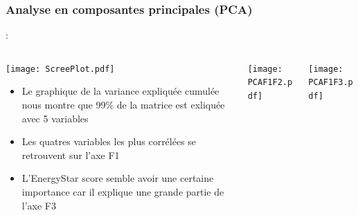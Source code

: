 \documentclass[8pt,aspectratio=169,hyperref={unicode=true}]{beamer}
\begin{document}
\subsubsection{Analyse en composantes principales (PCA)}
\begin{frame}[t]{\insertsection : \insertsubsection}{\insertsubsubsection}
  \begin{columns}
    \begin{column}{.33\textwidth}
      \texttt{[image: ScreePlot.pdf]}
      \begin{itemize}
        \item Le graphique de la variance expliquée cumulée nous montre que
              99\% de la matrice est exliquée avec 5 variables
        \item Les quatres variables les plus corrélées se retrouvent sur l'axe F1
        \item L'EnergyStar score semble avoir une certaine importance car il explique
              une grande partie de l'axe F3
      \end{itemize}
    \end{column}
    \begin{column}{.33\textwidth}
      \centering
      \texttt{[image: PCAF1F2.pdf]}
    \end{column}
    \begin{column}{.33\textwidth}
      \centering
      \texttt{[image: PCAF1F3.pdf]}
    \end{column}
  \end{columns}
\end{frame}
\end{document}
